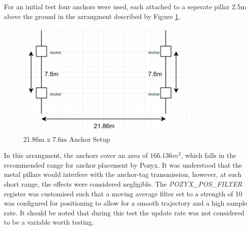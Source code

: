 \documentclass[12pt, a4paper]{article}
\begin{document}
For an initial test four anchors were used, each attached to a seperate pillar 2.5m above the ground in the arrangment described by Figure \ref{fig:setup1}.
\begin{figure}[h]
    \centering
    \includegraphics[width=0.8\textwidth]{setup1.png}
    \caption{21.86m x 7.6m Anchor Setup}
    \label{fig:setup1}
\end{figure}
In this arrangment, the anchors cover an area of $166.136m^2$, which falls in the recommended range for anchor placement by Pozyx. 
It was understood that the metal pillars would interfere with the anchor-tag transmission, however, at such short range, 
the effects were considered negligible. The \textit{POZYX\_POS\_FILTER} register was customised such that a moving 
average filter set to a strength of 10 was configured for positioning to allow for a smooth trajectory and a high sample rate. It should be 
noted that during this test the update rate was not considered to be a variable worth testing.
\end{document}
